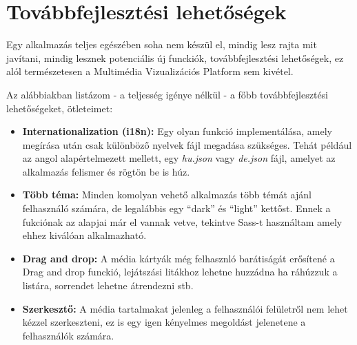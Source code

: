 \chapter{Továbbfejlesztési lehetőségek}
\label{appx:further_development}

Egy alkalmazás teljes egészében soha nem készül el, mindig lesz rajta mit javítani, mindig lesznek potenciális új funckiók, továbbfejlesztési lehetőségek, ez alól természetesen a Multimédia Vizualizációs Platform sem kivétel.

Az alábbiakban listázom - a teljesség igénye nélkül - a főbb továbbfejlesztési lehetőségeket, ötleteimet:
\begin{itemize}
    \item {\textbf {Internationalization (i18n): }} Egy olyan funkció implementálása, amely megírása után csak különböző nyelvek fájl megadása szükséges. Tehát például az angol alapértelmezett mellett, egy {\it hu.json} vagy {\it de.json} fájl, amelyet az alkalmazás felismer és rögtön be is húz.
	\item {\textbf {Több téma: }} Minden komolyan vehető alkalmazás több témát ajánl felhasználó számára, de legalábbis egy ``dark'' és ``light'' kettőst. Ennek a fukciónak az alapjai már el vannak vetve, tekintve Sass-t használtam amely ehhez kiválóan alkalmazható.
	\item {\textbf {Drag and drop: }} A média kártyák még felhasznló barátiságát erősítené a Drag and drop funckió, lejátszási litákhoz lehetne huzzádna ha ráhúzzuk a listára, sorrendet lehetne átrendezni stb.
	\item {\textbf {Szerkesztő: }} A média tartalmakat jelenleg a felhasználói felületről nem lehet kézzel szerkeszteni, ez is egy igen kényelmes megoldást jelenetene a felhasználók számára.
\end{itemize}
